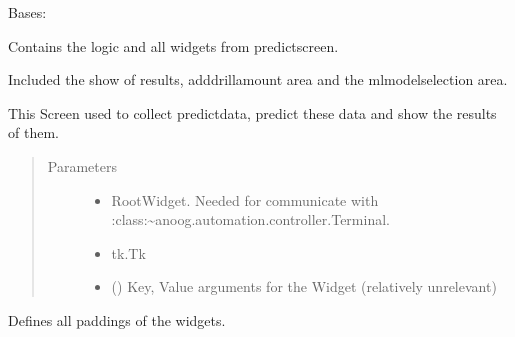 \documentclass[letterpaper,10pt,english]{sphinxmanual}
\begin{document}
\begin{fulllineitems}
\label{\detokenize{anoog.automation:anoog.automation.graphical_user_interface.Predict_Window}}
\sphinxAtStartPar
Bases: {\hyperref[\detokenize{anoog.automation:anoog.automation.graphical_user_interface.Screen}]{}}

\sphinxAtStartPar
Contains the logic and all widgets from predict\sphinxhyphen{}screen.

\sphinxAtStartPar
Included the show of results, add\sphinxhyphen{}drill\sphinxhyphen{}amount area and the ml\sphinxhyphen{}model\sphinxhyphen{}selection area.

\sphinxAtStartPar
This Screen used to collect predict\sphinxhyphen{}data, predict these data and show the results of them.
\begin{quote}\begin{description}
\item[{Parameters}] \leavevmode\begin{itemize}
\item {} 
\sphinxAtStartPar
{} \textendash{} Root\sphinxhyphen{}Widget. Needed for communicate with :class:\textasciitilde{}anoog.automation.controller.Terminal.

\item {} 
\sphinxAtStartPar
{} \textendash{} tk.Tk

\item {} 
\sphinxAtStartPar
{} () \textendash{} Key, Value arguments for the Widget (relatively unrelevant)

\end{itemize}

\end{description}\end{quote}

\begin{fulllineitems}
\label{\detokenize{anoog.automation:anoog.automation.graphical_user_interface.Predict_Window.add_padding}}
\sphinxAtStartPar
Defines all paddings of the widgets.


\end{fulllineitems}
\end{fulllineitems}
\end{document}
